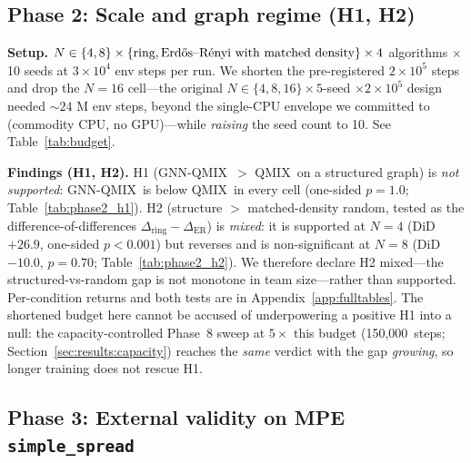 \documentclass[10pt]{article}
\newcommand{\algoname}[1]{\textsc{#1}}
\newcommand{\qmix}{\algoname{QMIX}}
\newcommand{\gnnqmix}{\algoname{GNN-QMIX}}
\newcommand{\PEsteps}{150{,}000}      %
\begin{document}


\subsection{Phase 2: Scale and graph regime (H1, H2)}
\label{sec:results:scale}

\textbf{Setup.} $N \in \{4, 8\} \times \{\text{ring}, \text{Erd\H{o}s--R\'enyi
with matched density}\} \times 4$ algorithms $\times$ 10 seeds at
$3\times 10^4$ env steps per run. We shorten the pre-registered
$2 \times 10^5$ steps and drop the $N{=}16$ cell---the original
$N \in \{4, 8, 16\} \times 5$-seed $\times 2 \times 10^5$ design needed
${\sim}24$ M env steps, beyond the single-CPU envelope we committed to
(commodity CPU, no GPU)---while \emph{raising} the seed count to 10.
See Table~\ref{tab:budget}.

\textbf{Findings (H1, H2).} H1 (\gnnqmix\ $>$ \qmix\ on a structured graph)
is \emph{not supported}: \gnnqmix\ is below \qmix\ in every cell (one-sided
$p=1.0$; Table~\ref{tab:phase2_h1}). H2 (structure $>$ matched-density random,
tested as the difference-of-differences $\Delta_{\text{ring}}-\Delta_{\text{ER}}$)
is \emph{mixed}: it is supported at $N{=}4$ (DiD $+26.9$, one-sided $p<0.001$)
but reverses and is non-significant at $N{=}8$ (DiD $-10.0$, $p=0.70$;
Table~\ref{tab:phase2_h2}). We therefore declare H2 mixed---the
structured-vs-random gap is not monotone in team size---rather than supported.
Per-condition returns and both tests are in Appendix~\ref{app:fulltables}.
The shortened budget here cannot be accused of underpowering a positive H1
into a null: the capacity-controlled Phase~8 sweep at $5\times$ this budget
(\PEsteps\ steps; Section~\ref{sec:results:capacity}) reaches the \emph{same}
verdict with the gap \emph{growing}, so longer training does not rescue H1.



\subsection{Phase 3: External validity on MPE \texttt{simple\_spread}}
\label{sec:results:mpe}
\end{document}
